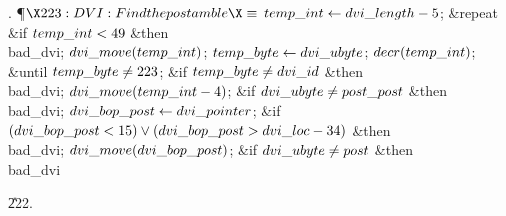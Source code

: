 . \P$\X223:DVI: Find the postamble\X\S$\6
$\\{temp\_int}\gets\\{dvi\_length}-5$;\6
\1\&{repeat} \&{if} $\\{temp\_int}<49$ \1\&{then}\5
\\{bad\_dvi};\2\6
$\\{dvi\_move}(\\{temp\_int})$;\5
$\\{temp\_byte}\gets\\{dvi\_ubyte}$;\5
$\\{decr}(\\{temp\_int})$;\6
\4\&{until}\5
$\\{temp\_byte}\ne223$;\2\6
\&{if} $\\{temp\_byte}\ne\\{dvi\_id}$ \1\&{then}\5
\\{bad\_dvi};\2\6
$\\{dvi\_move}(\\{temp\_int}-4)$;\6
\&{if} $\\{dvi\_ubyte}\ne\\{post\_post}$ \1\&{then}\5
\\{bad\_dvi};\2\6
$\\{dvi\_bop\_post}\gets\\{dvi\_pointer}$;\6
\&{if} $(\\{dvi\_bop\_post}<15)\lor(\\{dvi\_bop\_post}>\\{dvi\_loc}-34)$ \1%
\&{then}\5
\\{bad\_dvi};\2\6
$\\{dvi\_move}(\\{dvi\_bop\_post})$;\6
\&{if} $\\{dvi\_ubyte}\ne\\{post}$ \1\&{then}\5
\\{bad\_dvi}\2\par
\U222.\fi

